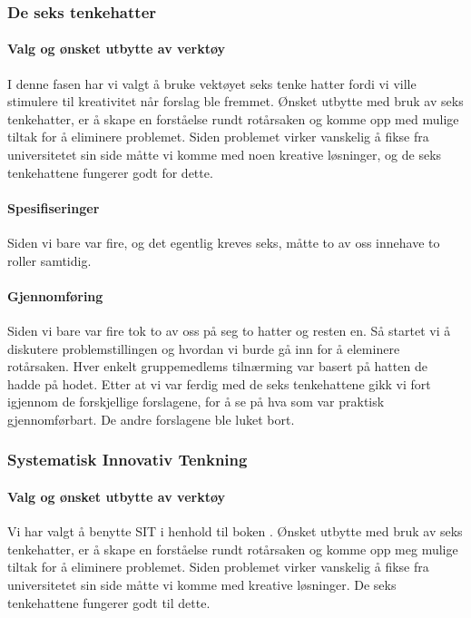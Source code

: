 \subsubsection{De seks tenkehatter}

\paragraph{Valg og ønsket utbytte av verktøy}
I denne fasen har vi valgt å bruke vektøyet seks tenke hatter fordi vi ville stimulere til kreativitet når forslag ble fremmet. Ønsket utbytte med bruk av seks tenkehatter, er å skape en forståelse rundt rotårsaken og komme opp med mulige tiltak for å eliminere problemet. Siden problemet virker vanskelig å fikse fra universitetet sin side måtte vi komme med noen kreative løsninger, og de seks tenkehattene fungerer godt for dette. 

\paragraph{Spesifiseringer}
Siden vi bare var fire, og det egentlig kreves seks, måtte to av oss innehave to roller samtidig. 

\paragraph{Gjennomføring}
Siden vi bare var fire tok to av oss på seg to hatter og resten en. Så startet vi å diskutere problemstillingen og hvordan vi burde gå inn for å eleminere rotårsaken. Hver enkelt gruppemedlems tilnærming var basert på hatten de hadde på hodet. Etter at vi var ferdig med de seks tenkehattene gikk vi fort igjennom de forskjellige forslagene, for å se på hva som var praktisk gjennomførbart. De andre forslagene ble luket bort. 


\subsubsection{Systematisk Innovativ Tenkning}

\paragraph{Valg og ønsket utbytte av verktøy}
Vi har valgt å benytte SIT i henhold til boken \cite{RCA}. Ønsket utbytte med bruk av seks tenkehatter, er å skape en forståelse rundt rotårsaken og komme opp meg mulige tiltak for å eliminere problemet. Siden problemet virker vanskelig å fikse fra universitetet sin side måtte vi komme med kreative løsninger. De seks tenkehattene fungerer godt til dette.

